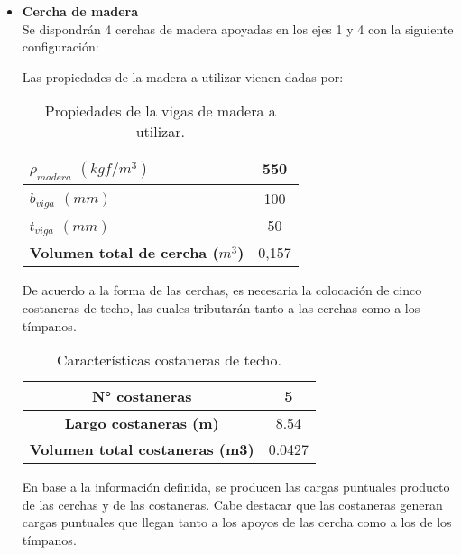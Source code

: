 \begin{itemize}
    \item \textbf{Cercha de madera}\\
    Se dispondrán 4 cerchas de madera apoyadas en los ejes 1 y 4 con la siguiente configuración:


    \newpage
   Las propiedades de la madera a utilizar vienen dadas por:
    
    \begin{table}[H]
  \centering
  \caption{Propiedades de la vigas de madera a utilizar.}
  \begin{tabular}{|l|c|}
    \hline
    \boldmath{}\textbf{$\rho_{madera}$ $ (kgf/m^3)$}\unboldmath{} & 550 \bigstrut\\
    \hline
    \boldmath{}\textbf{$b_{viga} $ $(mm)$}\unboldmath{} & 100 \bigstrut\\
    \hline
    \boldmath{}\textbf{$t_{viga}$ $ (mm)$}\unboldmath{} & 50 \bigstrut\\
    \hline
    \boldmath{}\textbf{Volumen total de cercha ($m^3$)}\unboldmath{} & 0,157 \bigstrut\\
    \hline
  \end{tabular}
  \label{vigamadera}
\end{table}

     De acuerdo a la forma de las cerchas, es necesaria la colocación de cinco costaneras de techo, las cuales tributarán tanto a las cerchas como a los tímpanos. 
     
         \begin{table}[H]
      \centering
      \caption{Características costaneras de techo.}
      \begin{tabular}{|c|c|}
        \hline
        \textbf{N° costaneras} & 5 \bigstrut\\
        \hline
        \textbf{Largo costaneras (m)} & 8.54 \bigstrut\\
        \hline
        \textbf{Volumen total costaneras (m3)} & 0.0427 \bigstrut\\
        \hline
      \end{tabular}
      \label{costarneras}
    \end{table}

    En base a la información definida, se producen las cargas puntuales producto de las cerchas y de las costaneras. Cabe destacar que las costaneras generan cargas puntuales que llegan tanto a los apoyos de las cercha como a los de los tímpanos.
    

\end{itemize}
